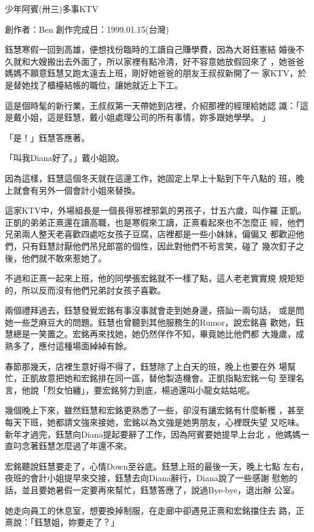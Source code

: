 



少年阿賓(卅三)多事KTV

創作者：Ben
創作完成日：1999.01.15(台灣)


鈺慧寒假一回到高雄，便想找份臨時的工讀自己賺學費，因為大哥鈺憲結
婚後不久就和大嫂搬出去外面了，所以家裡有點冷清，好不容意她放假回來了
，她爸爸媽媽不願意鈺慧又跑太遠去上班，剛好她爸爸的朋友王叔叔新開了一
家KTV，於是替她找了櫃檯結帳的職位，讓她就近上下工。

這是個時髦的新行業，王叔叔第一天帶她到店裡，介紹那裡的經理給她認
識：「這是戴小姐，這是鈺慧，戴小姐處理公司的所有事情，妳多跟她學學。
」

「是！」鈺慧答應著。

「叫我Diana好了。」戴小姐說。

因為這樣，鈺慧這個冬天就在這邊工作，她固定上早上十點到下午八點的
班，晚上就會有另外一個會計小姐來替換。

這家KTV中，外場組長是一個長得邪裡邪氣的男孩子，廿五六歲，叫作羅
正凱。正凱的弟弟正熹還在讀高職，也是寒假來工讀，正熹看起來也不怎麼正
經，他們兄弟兩人整天老喜歡四處吃女孩子豆腐，店裡都是一些小妹妹，偏偏又
都歡迎他們，只有鈺慧討厭他們吊兒郎當的個性，因此對他們不茍言笑，碰了
幾次釘子之後，他們就不敢來惹她了。

不過和正熹一起來上班，他的同學張宏銘就不一樣了點，這人老老實實規
規矩矩的，所以反而沒有他們兄弟討女孩子喜歡。

兩個禮拜過去，鈺慧發覺宏銘有事沒事就會走到她身邊，搭訕一兩句話，
或是問她一些芝麻豆大的問題。鈺慧也曾聽到其他服務生的Rumor，說宏銘喜
歡她，鈺慧總是一笑置之。宏銘再來找她，她仍然佯作不知，畢竟她比他們都
大幾歲，成熟多了，應付這種場面綽綽有餘。

春節那幾天，店裡生意好得不得了，鈺慧除了上白天的班，晚上也要在外
場幫忙，正凱故意把她和宏銘排在同一區，替他製造機會。正凱指點宏銘一句
至理名言，他說「烈女怕纏」，要宏銘努力到底，楊過還叫小龍女姑姑呢。

幾個晚上下來，雖然鈺慧和宏銘更熟悉了一些，卻沒有讓宏銘有什麼斬穫
，甚至每天下班，她都請文強來接她，宏銘以為文強是她男朋友，心裡既失望
又吃味。新年才過完，鈺慧向Diana提起要辭了工作，因為阿賓要她提早上台北
，他媽媽一直叼念著鈺慧怎麼過了年還不來。

宏銘聽說鈺慧要走了，心情Down至谷底。鈺慧上班的最後一天，晚上七點
左右，夜班的會計小姐提早來交接，鈺慧去向Diana辭行，Diana說了一些感謝
慰勉的話，並且要她暑假一定要再來幫忙，鈺慧答應了，說過Bye-bye，退出辦
公室。

她走向員工的休息室，想要換掉制服，在走廊中卻遇見正熹和宏銘擋住去
路，正熹說：「鈺慧姐，妳要走了？」

